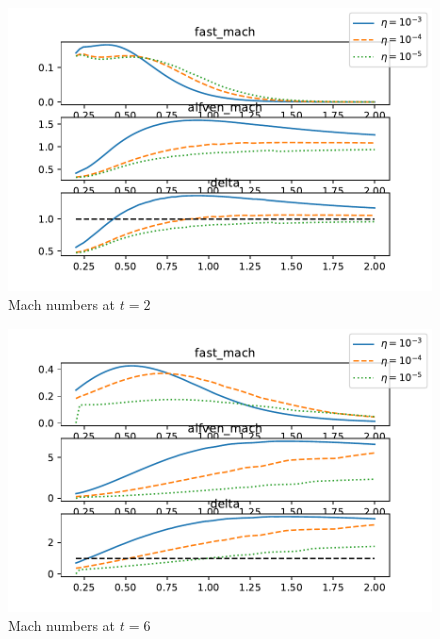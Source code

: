 \begin{figure}[h]
  \centering
  \includegraphics[width=0.8\linewidth]{./images/null_point_khi/mach_numbersv-32.pdf}
  \caption{Mach numbers at $t=2$}
  \label{fig:mach_numbersv_32}
\end{figure}

\begin{figure}[h]
  \centering
  \includegraphics[width=0.8\linewidth]{./images/null_point_khi/mach_numbersv-36.pdf}
  \caption{Mach numbers at $t=6$}
  \label{fig:mach_numbersv-36}
\end{figure}

